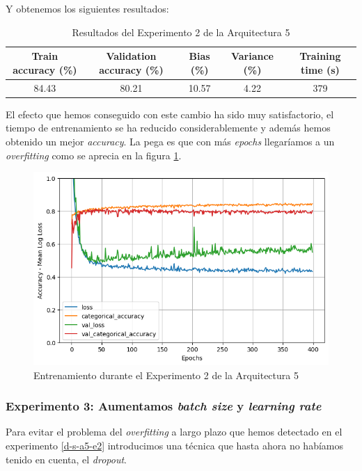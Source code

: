 \documentclass{article}
\begin{document}
			Y obtenemos los siguientes resultados:
			\begin{table}[!h]
				\begin{center}
					\begin{tabular}{| c | c | c | c | c |}
						\textbf{Train accuracy (\%)} & \textbf{Validation accuracy (\%)} & \textbf{Bias (\%)} & \textbf{Variance (\%)} & \textbf{Training time (s)} \\ \hline
						84.43 & 80.21 & 10.57 & 4.22 & 379\\ \hline
					\end{tabular}
					\caption{Resultados del Experimento 2 de la Arquitectura 5}
					\label{tab:res-d-a5-e2}
				\end{center}
			\end{table}
		    
		    El efecto que hemos conseguido con este cambio ha sido muy satisfactorio, el tiempo de entrenamiento se ha reducido considerablemente y adem\'as hemos obtenido un mejor \textit{accuracy}. La pega es que con m\'as \textit{epochs} llegar\'iamos a un \textit{overfitting} como se aprecia en la figura \ref{d-tr-a5-e2}.
		    
			\begin{figure}[!h]
				\begin{center}
					\includegraphics[scale=0.5]{d-tr-a5-e2.png}		
					\caption{Entrenamiento durante el Experimento 2 de la Arquitectura 5}	
					\label{d-tr-a5-e2}
				\end{center}
			\end{figure}
		
		\subsubsection{Experimento 3: Aumentamos \textit{batch size} y \textit{learning rate}}
		\label{d-s-a5-e3}
			Para evitar el problema del \textit{overfitting} a largo plazo que hemos detectado en el experimento \ref{d-s-a5-e2} introducimos una t\'ecnica que hasta ahora no hab\'iamos tenido en cuenta, el \textit{dropout}.
		
\end{document}
